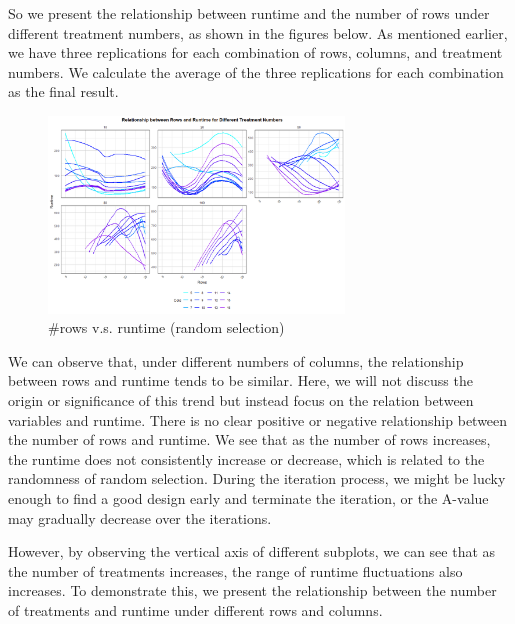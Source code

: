 \documentclass[
  a4paper,
  oneside,
  openany,
  12pt,
  onecolumn]{book}
\theoremstyle{definition}
\theoremstyle{plain}
\theoremstyle{remark}
\begin{document}
So we present the relationship between runtime and the number of rows
under different treatment numbers, as shown in the figures below. As
mentioned earlier, we have three replications for each combination of
rows, columns, and treatment numbers. We calculate the average of the
three replications for each combination as the final result.

\begin{figure}[H]

{\centering \includegraphics[width=0.7\textwidth,height=\textheight]{images/Rplots/RS_eva/RS-row-vs-runtime.png}

}

\caption{\#rows v.s. runtime (random selection)}

\end{figure}%

We can observe that, under different numbers of columns, the
relationship between rows and runtime tends to be similar. Here, we will
not discuss the origin or significance of this trend but instead focus
on the relation between variables and runtime. There is no clear
positive or negative relationship between the number of rows and
runtime. We see that as the number of rows increases, the runtime does
not consistently increase or decrease, which is related to the
randomness of random selection. During the iteration process, we might
be lucky enough to find a good design early and terminate the iteration,
or the A-value may gradually decrease over the iterations.

However, by observing the vertical axis of different subplots, we can
see that as the number of treatments increases, the range of runtime
fluctuations also increases. To demonstrate this, we present the
relationship between the number of treatments and runtime under
different rows and columns.
\end{document}
